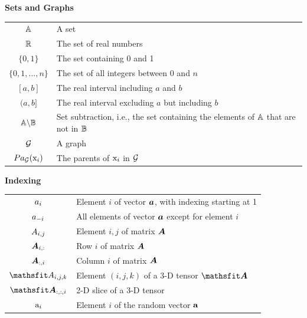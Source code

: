 \vspace{\notationgap}
\noindent\begin{minipage}{\textwidth}
\centerline{\bf Sets and Graphs}
\bgroup
\def\arraystretch{1.5}
\begin{tabular}{cp{3.25in}}
$\displaystyle {\mathbb{A}}$ & A set\\
$\displaystyle \mathbb{R}$ & The set of real numbers \\
$\displaystyle \{0, 1\}$ & The set containing 0 and 1 \\
$\displaystyle \{0, 1, \dots, n \}$ & The set of all integers between $0$ and $n$\\
$\displaystyle [a, b]$ & The real interval including $a$ and $b$\\
$\displaystyle (a, b]$ & The real interval excluding $a$ but including $b$\\
$\displaystyle {\mathbb{A}} \backslash {\mathbb{B}}$ & Set subtraction, i.e., the set containing the elements of ${\mathbb{A}}$ that are not in ${\mathbb{B}}$\\
$\displaystyle {\mathcal{G}}$ & A graph\\
$\displaystyle Pa_{\mathcal{G}}({\textnormal{x}}_i)$ & The parents of ${\textnormal{x}}_i$ in ${\mathcal{G}}$
\end{tabular}
\egroup
{}
\end{minipage}

\vspace{\notationgap}
\noindent\begin{minipage}{\textwidth}
\centerline{\bf Indexing}
\bgroup
\def\arraystretch{1.5}
\begin{tabular}{cp{3.25in}}
$\displaystyle {a}_i$ & Element $i$ of vector ${\bm{a}}$, with indexing starting at 1 \\
$\displaystyle {a}_{-i}$ & All elements of vector ${\bm{a}}$ except for element $i$ \\
$\displaystyle {A}_{i,j}$ & Element $i, j$ of matrix ${\bm{A}}$ \\
$\displaystyle {\bm{A}}_{i, :}$ & Row $i$ of matrix ${\bm{A}}$ \\
$\displaystyle {\bm{A}}_{:, i}$ & Column $i$ of matrix ${\bm{A}}$ \\
$\displaystyle \etA_{i, j, k}$ & Element $(i, j, k)$ of a 3-D tensor $\tA$\\
$\displaystyle \tA_{:, :, i}$ & 2-D slice of a 3-D tensor\\
$\displaystyle {\textnormal{a}}_i$ & Element $i$ of the random vector ${\mathbf{a}}$ \\
\end{tabular}
\egroup
\end{minipage}


